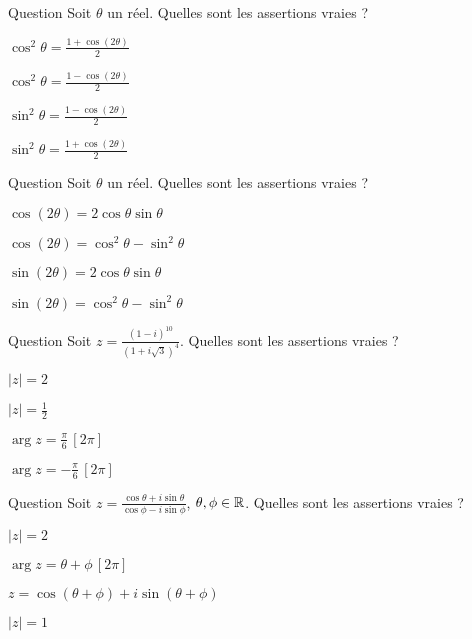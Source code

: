 \begin{multi}[multiple,feedback=
{On peut appliquer les formules d'Euler, ou utiliser la formule d'addition du cosinus. 
}]{Question}
Soit \(\theta\) un réel.  Quelles sont les assertions vraies ?

    \item* \(\cos^2\theta= \frac{1+\cos(2\theta)}{2}\)
    \item \(\cos^2\theta= \frac{1-\cos(2\theta)}{2}\)
    \item* \(\sin^2\theta= \frac{1-\cos(2\theta)}{2}\)
    \item \(\sin^2\theta= \frac{1+\cos(2\theta)}{2}\)
\end{multi}


\begin{multi}[multiple,feedback=
{On peut appliquer la formule de Moivre, ou utiliser les formules d'addition du cosinus et du sinus. 
}]{Question}
Soit \(\theta\) un réel.  Quelles sont les assertions vraies ?

    \item \(\cos(2\theta)= 2\cos\theta \sin \theta\)
    \item* \(\cos(2\theta)= \cos^2\theta -\sin^2 \theta\)
    \item* \(\sin(2\theta)= 2\cos\theta \sin \theta\)
    \item \(\sin(2\theta)= \cos^2\theta -\sin^2 \theta\)
\end{multi}


\begin{multi}[multiple,feedback=
{On applique les formules :
\(|\frac{z_1^n}{z_2^m}|= \frac{|z_1|^n}{|z_2|^m}\)   et \(\arg(\frac{z_1^n}{z_2^m})= n\arg z_1 - m\arg z_2 \, [2\pi]\). 
}]{Question}
Soit \(z=\frac{(1-i)^{10}}{(1+i\sqrt 3)^4}\). Quelles sont les assertions vraies ?

    \item* \(|z|=2\)
    \item \(|z|=\frac{1}{2}\)
    \item* \(\arg z = \frac{\pi}{6} \, [2\pi]\)
    \item \(\arg z = -\frac{\pi}{6} \, [2\pi]\)
\end{multi}


\begin{multi}[multiple,feedback=
{Utiliser l'écrire trigonométrique et  la formule : \(\frac{e^{i\theta}}{e^{-i\phi}}= e^{i(\theta + \phi)} \).
}]{Question}
Soit \(z=\frac{\cos \theta + i \sin \theta}{\cos \phi - i \sin \phi}\), \(\theta, \phi \in \mathbb{R}\). 
Quelles sont les assertions vraies ?

    \item \(|z|=2\)
    \item* \(\arg z = \theta + \phi \, [2\pi]\)
    \item* \(z = \cos (\theta+\phi) + i \sin (\theta + \phi)\)
    \item* \(|z|=1\)
\end{multi}


